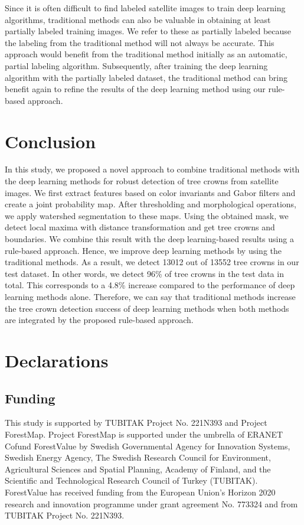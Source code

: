 \documentclass{article}
\begin{document}
Since it is often difficult to find labeled satellite images to train deep learning algorithms, traditional methods can also be valuable in obtaining at least partially labeled training images. We refer to these as partially labeled because the labeling from the traditional method will not always be accurate. This approach would benefit from the traditional method initially as an automatic, partial labeling algorithm. Subsequently, after training the deep learning algorithm with the partially labeled dataset, the traditional method can bring benefit again to refine the results of the deep learning method using our rule-based approach.

\section{Conclusion}

In this study, we proposed a novel approach to combine traditional methods with the deep learning methods for robust detection of tree crowns from satellite images. We first extract features based on color invariants and Gabor filters and create a joint probability map. After thresholding and morphological operations, we apply watershed segmentation to these maps. Using the obtained mask, we detect local maxima with distance transformation and get tree crowns and boundaries. We combine this result with the deep learning-based results using a rule-based approach. Hence, we improve deep learning methods by using the traditional methods. As a result, we detect 13012 out of 13552 tree crowns in our test dataset. In other words, we detect 96\% of tree crowns in the test data in total. This corresponds to a 4.8\% increase compared to the performance of deep learning methods alone. Therefore, we can say that traditional methods increase the tree crown detection success of deep learning methods when both methods are integrated by the proposed rule-based approach.

\section*{Declarations}

\subsection*{Funding}

This study is supported by TUBITAK Project No. 221N393 and Project ForestMap. Project ForestMap is supported under the umbrella of ERANET Cofund ForestValue by Swedish Governmental Agency for Innovation Systems, Swedish Energy Agency, The Swedish Research Council for Environment, Agricultural Sciences and Spatial Planning, Academy of Finland, and the Scientific and Technological Research Council of Turkey (TUBITAK). ForestValue has received funding from the European Union’s Horizon 2020 research and innovation programme under grant agreement No. 773324 and from TUBITAK Project No. 221N393. 
\end{document}
